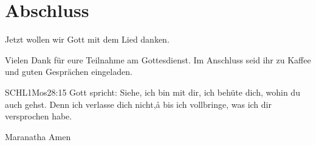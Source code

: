 \documentclass{../../inc/mybib}
\begin{document}


\section{Abschluss}

Jetzt wollen wir Gott mit dem Lied  danken.

Vielen Dank für eure Teilnahme am Gottesdienst. Im Anschluss seid ihr zu Kaffee und guten Gesprächen eingeladen.
\beten{}

\begin{bibelbox}{SCHL}{1Mos}{28:15}
Gott spricht: Siehe, ich bin mit dir,
ich behüte dich, wohin du auch gehst.
Denn ich verlasse dich nicht,å
bis ich vollbringe, was ich dir versprochen habe.
\end{bibelbox}

Maranatha Amen
\end{document}
